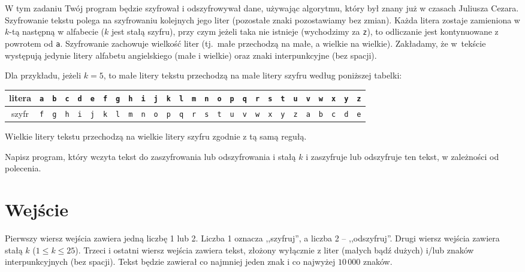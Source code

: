 \documentclass{spiral-kurs}
\begin{document}
\makeheader
%
  W tym zadaniu Twój program będzie szyfrował i odszyfrowywał dane, używając algorytmu,
  który był znany już w czasach Juliusza Cezara.
  Szyfrowanie tekstu polega na szyfrowaniu kolejnych jego liter (pozostałe znaki pozostawiamy bez zmian).
  Każda litera zostaje zamieniona w $k$-tą następną w alfabecie
  ($k$ jest stałą szyfru), przy czym jeżeli taka nie istnieje (wychodzimy za \texttt{z}), to
  odliczanie jest kontynuowane z powrotem od \texttt{a}.
  Szyfrowanie zachowuje wielkość liter (tj.\ małe przechodzą na małe, a wielkie na wielkie).
  Zakładamy, że w~tekście występują jedynie litery alfabetu angielskiego (małe i wielkie)
  oraz znaki interpunkcyjne (bez spacji).

  Dla przykładu, jeżeli $k=5$, to małe litery tekstu przechodzą na małe litery szyfru według poniższej tabelki:

  \medskip
  \noindent
  {\small
    \begin{center}
  \begin{tabular}{|c|c|c|c|c|c|c|c|c|c|c|c|c|c|c|c|c|c|c|c|c|c|c|c|c|c|c|}
    \hline
    litera & 
    \texttt{a} & \texttt{b} & \texttt{c} & \texttt{d} & \texttt{e} & \texttt{f} & \texttt{g} & \texttt{h} & \texttt{i} & \texttt{j} & \texttt{k} & \texttt{l} & \texttt{m} & \texttt{n} & \texttt{o} & \texttt{p} & \texttt{q} & \texttt{r} & \texttt{s} & \texttt{t} & \texttt{u} & \texttt{v} & \texttt{w} & \texttt{x} & \texttt{y} & \texttt{z} \\\hline 
    szyfr &
    \texttt{f} & \texttt{g} & \texttt{h} & \texttt{i} & \texttt{j} & \texttt{k} & \texttt{l} & \texttt{m} & \texttt{n} & \texttt{o} & \texttt{p} & \texttt{q} & \texttt{r} & \texttt{s} & \texttt{t} & \texttt{u} & \texttt{v} & \texttt{w} & \texttt{x} & \texttt{y} & \texttt{z} & \texttt{a} & \texttt{b} & \texttt{c} & \texttt{d} & \texttt{e} \\\hline
  \end{tabular}
\end{center}
}

  \medskip
  \noindent
  Wielkie litery tekstu przechodzą na wielkie litery szyfru zgodnie z tą samą regułą.

  Napisz program, który wczyta tekst do zaszyfrowania lub odszyfrowania i stałą $k$
  i zaszyfruje lub odszyfruje ten tekst, w zależności od polecenia.
  
  \section{Wejście}
  Pierwszy wiersz wejścia zawiera jedną liczbę 1 lub 2.
  Liczba 1 oznacza ,,szyfruj'', a liczba 2 -- ,,odszyfruj''.
  Drugi wiersz wejścia zawiera stałą $k$ ($1\le k\le 25$).
  Trzeci i ostatni wiersz wejścia zawiera tekst, złożony wyłącznie z liter (małych bądź dużych) i/lub znaków interpunkcyjnych (bez spacji).
  Tekst będzie zawierał co najmniej jeden znak i co najwyżej $10\,000$ znaków.
\end{document}
